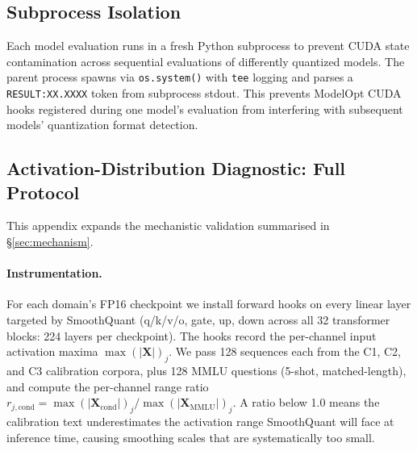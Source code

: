 \documentclass[11pt]{article}
\begin{document}
\subsection{Subprocess Isolation}

Each model evaluation runs in a fresh Python subprocess to prevent
CUDA state contamination across sequential evaluations of differently
quantized models.  The parent process spawns via \texttt{os.system()}
with \texttt{tee} logging and parses a \texttt{RESULT:XX.XXXX} token
from subprocess stdout.  This prevents ModelOpt CUDA hooks registered
during one model's evaluation from interfering with subsequent models'
quantization format detection.

\subsection{Activation-Distribution Diagnostic: Full Protocol}
\label{app:act4}

This appendix expands the mechanistic validation summarised in
\S\ref{sec:mechanism}.

\paragraph{Instrumentation.}
For each domain's FP16 checkpoint we install forward hooks on every
linear layer targeted by SmoothQuant (q/k/v/o, gate, up, down across
all 32 transformer blocks: 224 layers per checkpoint).  The hooks
record the per-channel input activation maxima
$\max(|\mathbf{X}|)_j$.  We pass 128 sequences each from the C1, C2,
and C3 calibration corpora, plus 128 MMLU questions (5-shot,
matched-length), and compute the per-channel range ratio
$r_{j,\text{cond}} = \max(|\mathbf{X}_\text{cond}|)_j /
\max(|\mathbf{X}_\text{MMLU}|)_j$.  A ratio below 1.0 means the
calibration text underestimates the activation range SmoothQuant
will face at inference time, causing smoothing scales that
are systematically too small.
\end{document}
